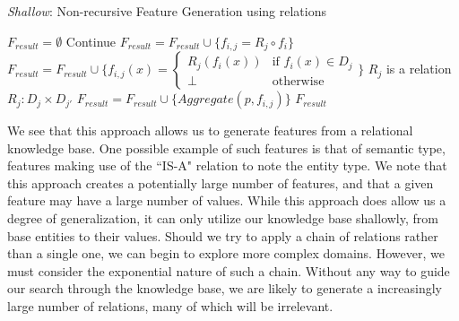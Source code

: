 \documentclass[twoside,11pt]{article}
\theoremstyle{definition}
\begin{document}
\begin{algorithm}[H]
	\caption{\emph{Shallow}: Non-recursive Feature Generation using relations}
	\label{code-compete}
	\small
	\begin{algorithmic}
		\State $F_{result}=\emptyset$
			\State Continue
			\State $F_{result}=F_{result}\cup \{f_{i,j}=R_j\circ f_i\}$
			\State $F_{result}=F_{result}\cup \{f_{i,j}(x)=\begin{cases} R_j( f_i(x)) &\mbox{if } f_i(x)\in D_j\\ 
			\perp & \mbox{otherwise } \end{cases}\}$
		\Else \Comment $R_j$ is a relation $R_j:D_j\times D_{j'}$
		\State $F_{result}=F_{result}\cup \{Aggregate(p,f_{i,j})\}$
		\EndIf
		\EndFor
		\EndFor
		\State \Return $F_{result}$ 
		\EndFunction
		
	\end{algorithmic}
\end{algorithm}

We see that this approach allows us to generate features from a relational knowledge base. One possible example of such features is that of semantic type, features making use of the ``IS-A" relation to note the entity type. We note that this approach creates a potentially large number of features, and that a given feature may have a large number of values. While this approach does allow us a degree of generalization, it can only utilize our knowledge base shallowly, from base entities to their values. 
Should we try to apply a chain of relations rather than a single one, we can begin to explore more complex domains. However, we must consider the exponential nature of such a chain. Without any way to guide our search through the knowledge base, we are likely to generate a increasingly large number of relations, many of which will be irrelevant. 

\end{document}
